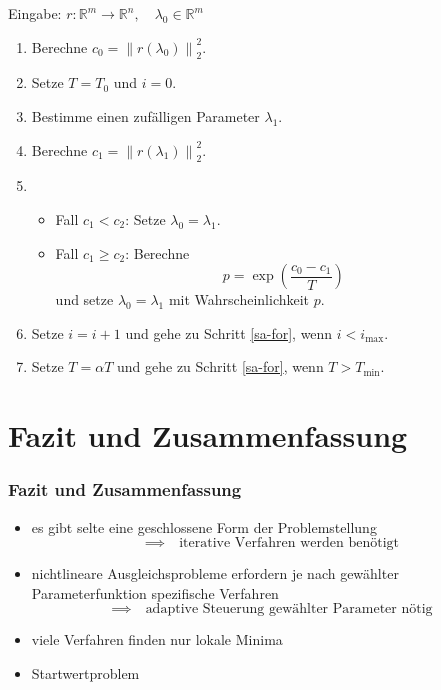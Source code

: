 \documentclass[aspectratio=169]{beamer}
\newcommand{\curvb}[1]{\left( #1 \right)}
\newcommand{\norm}[1]{\left\| #1 \right\|}
\newcommand{\SR}{\mathds{R}} %
\newcommand{\m}[1]{\mathrm{#1}}
\begin{document}
		\begin{frame}
			\begin{tcolorbox}[colframe=black,colbacktitle=white,coltitle=black, attach boxed title to top center={yshift=-2mm},enhanced, titlerule=0.1pt, boxrule=0.5pt, breakable, arc=5pt,title=Algorithmus:\quad Simulated Annealing]
				Eingabe: $r:\SR^m\longrightarrow\SR^n,\quad \lambda_0\in\SR^m$

				\begin{enumerate}[label=\normalfont (\arabic*)]
					\item Berechne $c_0 = \norm{ r\curvb{ \lambda_0 } }_2^2$.
					\item Setze $T = T_0$ und $i=0$.
					\item \label{sa-for} Bestimme einen zufälligen Parameter $\lambda_1$.
					\item Berechne $c_1 = \norm{ r\curvb{ \lambda_1 } }_2^2$.
					\item
						\begin{itemize}
							\item Fall $c_1 < c_2$: Setze $\lambda_0 = \lambda_1$.
							\item Fall $c_1 \geq c_2$: Berechne
								\[ p = \exp\curvb{ \frac{c_0 - c_1}{T} } \]
								und setze $\lambda_0 = \lambda_1$ mit Wahrscheinlichkeit $p$. 
						\end{itemize}
					\item Setze $i=i+1$ und gehe zu Schritt \ref{sa-for}, wenn $i < i_\m{max}$.
					\item Setze $T=\alpha T$ und gehe zu Schritt \ref{sa-for}, wenn $T > T_\m{min}$.
				\end{enumerate}
			\end{tcolorbox}
		\end{frame}


	\section{Fazit und Zusammenfassung} %
	\label{sec:fazit_und_zusammenfassung}
	
		\begin{frame}
			\frametitle{Fazit und Zusammenfassung}
			

			\begin{itemize}[label=$\circ$]
				\item es gibt selte eine geschlossene Form der Problemstellung
				\[ \implies \quad \text{iterative Verfahren werden benötigt} \]
				\item nichtlineare Ausgleichsprobleme erfordern je nach gewählter Parameterfunktion spezifische Verfahren
				\[ \implies \quad \text{adaptive Steuerung gewählter Parameter nötig} \]
				\item viele Verfahren finden nur lokale Minima
				\item Startwertproblem
			\end{itemize}
		\end{frame}
\end{document}
